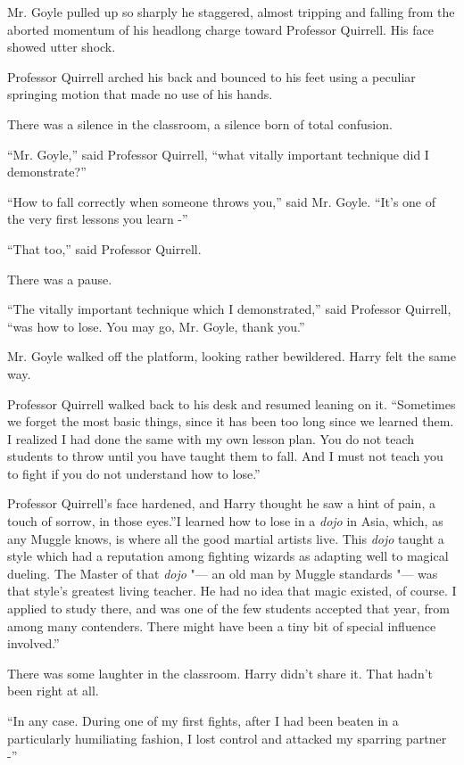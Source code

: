 Mr. Goyle pulled up so sharply he staggered, almost tripping and falling
from the aborted momentum of his headlong charge toward Professor
Quirrell. His face showed utter shock.

Professor Quirrell arched his back and bounced to his feet using a
peculiar springing motion that made no use of his hands.

There was a silence in the classroom, a silence born of total confusion.

``Mr. Goyle,'' said Professor Quirrell, ``what vitally important
technique did I demonstrate?''

``How to fall correctly when someone throws you,'' said Mr. Goyle.
``It's one of the very first lessons you learn -''

``That too,'' said Professor Quirrell.

There was a pause.

``The vitally important technique which I demonstrated,'' said Professor
Quirrell, ``was how to lose. You may go, Mr. Goyle, thank you.''

Mr. Goyle walked off the platform, looking rather bewildered. Harry felt
the same way.

Professor Quirrell walked back to his desk and resumed leaning on it.
``Sometimes we forget the most basic things, since it has been too long
since we learned them. I realized I had done the same with my own lesson
plan. You do not teach students to throw until you have taught them to
fall. And I must not teach you to fight if you do not understand how to
lose.''

Professor Quirrell's face hardened, and Harry thought he saw a hint of
pain, a touch of sorrow, in those eyes.''I learned how to lose in a
\emph{dojo} in Asia, which, as any Muggle knows, is where all the good
martial artists live. This \emph{dojo} taught a style which had a
reputation among fighting wizards as adapting well to magical dueling.
The Master of that \emph{dojo} "--- an old man by Muggle standards "--- was
that style's greatest living teacher. He had no idea that magic existed,
of course. I applied to study there, and was one of the few students
accepted that year, from among many contenders. There might have been a
tiny bit of special influence involved.''

There was some laughter in the classroom. Harry didn't share it. That
hadn't been right at all.

``In any case. During one of my first fights, after I had been beaten in
a particularly humiliating fashion, I lost control and attacked my
sparring partner -''


